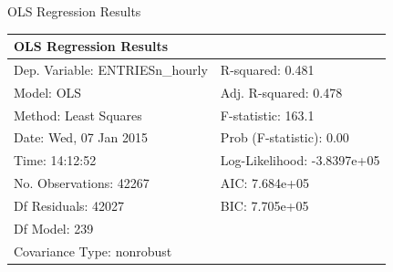 \documentclass[a4paper,12pt,english]{sphinxmanual}
\begin{document}
\begin{threeparttable}
\capstart\caption{OLS Regression Results}

\begin{tabulary}{\linewidth}{|L|L|}
\hline
\textsf{\relax 
OLS Regression Results
} & \textsf{\relax }\\
\hline
Dep. Variable:        ENTRIESn\_hourly
 & 
R-squared:                       0.481
\\

Model:                            OLS
 & 
Adj. R-squared:                  0.478
\\

Method:                 Least Squares
 & 
F-statistic:                     163.1
\\

Date:                Wed, 07 Jan 2015
 & 
Prob (F-statistic):               0.00
\\

Time:                        14:12:52
 & 
Log-Likelihood:            -3.8397e+05
\\

No. Observations:               42267
 & 
AIC:                         7.684e+05
\\

Df Residuals:                   42027
 & 
BIC:                         7.705e+05
\\

Df Model:                         239
 & \\

Covariance Type:            nonrobust
 & \\
\hline\end{tabulary}

\end{threeparttable}

\label{section2:table32}
\end{document}
